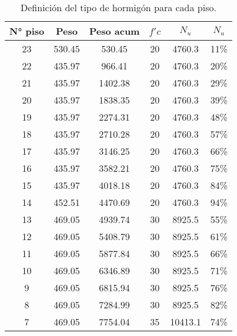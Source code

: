 \begin{itemize}
\begin{table}[H]
  \centering
  \caption{Definición del tipo de hormigón para cada piso.}
  \begin{tabular}{|c|cc|c|c|c|}
    \hline
    \textbf{N° piso} & \textbf{Peso} & \textbf{Peso acum} & \boldmath{}\textbf{$f'c$}\unboldmath{} & \boldmath{}\textbf{$N_u$}\unboldmath{} & \boldmath{}\textbf{$N_u$}\unboldmath{} \bigstrut\\
    \hline
    23    & 530.45 & 530.45 & \cellcolor[rgb]{ .816,  .808,  .808}20 & 4760.3 & 11\% \bigstrut[t]\\
    22    & 435.97 & 966.41 & \cellcolor[rgb]{ .816,  .808,  .808}20 & 4760.3 & 20\% \\
    21    & 435.97 & 1402.38 & \cellcolor[rgb]{ .816,  .808,  .808}20 & 4760.3 & 29\% \\
    20    & 435.97 & 1838.35 & \cellcolor[rgb]{ .816,  .808,  .808}20 & 4760.3 & 39\% \\
    19    & 435.97 & 2274.31 & \cellcolor[rgb]{ .816,  .808,  .808}20 & 4760.3 & 48\% \\
    18    & 435.97 & 2710.28 & \cellcolor[rgb]{ .816,  .808,  .808}20 & 4760.3 & 57\% \\
    17    & 435.97 & 3146.25 & \cellcolor[rgb]{ .816,  .808,  .808}20 & 4760.3 & 66\% \\
    16    & 435.97 & 3582.21 & \cellcolor[rgb]{ .816,  .808,  .808}20 & 4760.3 & 75\% \\
    15    & 435.97 & 4018.18 & \cellcolor[rgb]{ .816,  .808,  .808}20 & 4760.3 & 84\% \\
    14    & 452.51 & 4470.69 & \cellcolor[rgb]{ .816,  .808,  .808}20 & 4760.3 & 94\% \\
    13    & 469.05 & 4939.74 & \cellcolor[rgb]{ .651,  .651,  .651}30 & 8925.5 & 55\% \\
    12    & 469.05 & 5408.79 & \cellcolor[rgb]{ .651,  .651,  .651}30 & 8925.5 & 61\% \\
    11    & 469.05 & 5877.84 & \cellcolor[rgb]{ .651,  .651,  .651}30 & 8925.5 & 66\% \\
    10    & 469.05 & 6346.89 & \cellcolor[rgb]{ .651,  .651,  .651}30 & 8925.5 & 71\% \\
    9     & 469.05 & 6815.94 & \cellcolor[rgb]{ .651,  .651,  .651}30 & 8925.5 & 76\% \\
    8     & 469.05 & 7284.99 & \cellcolor[rgb]{ .651,  .651,  .651}30 & 8925.5 & 82\% \\
    7     & 469.05 & 7754.04 & \cellcolor[rgb]{ .502,  .502,  .502}35 & 10413.1 & 74\% \\

\end{tabular}
\end{table}
\end{itemize}
